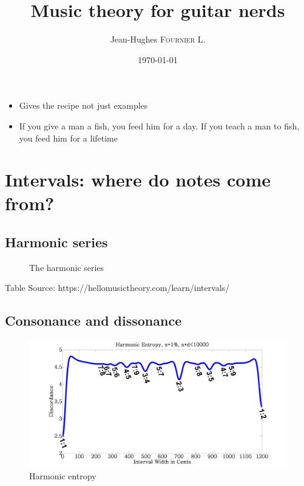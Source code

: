 \documentclass{article}
\title{ Music theory for guitar nerds  } %
\author{ Jean-Hughes \textsc{Fournier L.} } %
\date{\today} %
\begin{document}
\maketitle %
\newpage
\tableofcontents
\newpage

\begin{itemize}
	\item Gives the recipe not just examples
	\item If you give a man a fish, you feed him for a day. If you teach a man to fish, you feed him for a lifetime
\end{itemize}

\section{Intervals: where do notes come from?}


\subsection{Harmonic series}

\begin{figure}[h!]
	\centering
	\scalebox{1}{}
	\caption{The harmonic series}
	\label{fig:serie_harmonique}
\end{figure}




 Table
 Source: https://hellomusictheory.com/learn/intervals/



\subsection{Consonance and dissonance}

\begin{figure}[h!]
	\centering
	\hspace*{0cm}
	\includegraphics[scale=0.03, trim= {0cm 0cm 0cm 0cm}, clip]{Harmonic_entropy.png}
	\caption{Harmonic entropy}
	\label{fig}
\end{figure}
\end{document}
